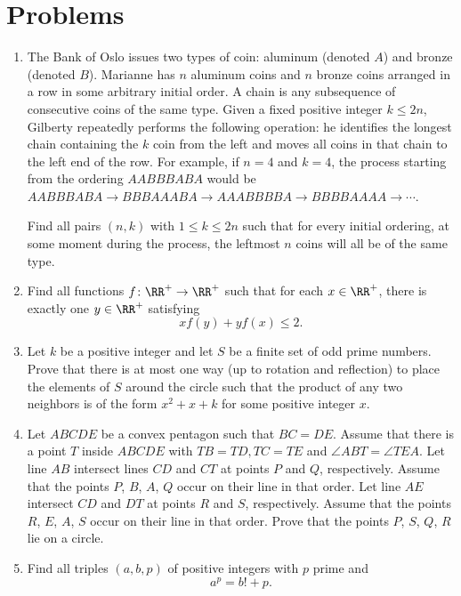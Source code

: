 \documentclass[11pt]{scrartcl}
\begin{document}
\section{Problems}
\begin{enumerate}[\bfseries 1.]
\item %
The Bank of Oslo issues two types of coin: aluminum (denoted $A$) and bronze
(denoted $B$). Marianne has $n$ aluminum coins and $n$ bronze coins arranged in a
row in some arbitrary initial order.
A chain is any subsequence of consecutive coins of the same type.
Given a fixed positive integer $k \leq 2n$,
Gilberty repeatedly performs the following operation:
he identifies the longest chain containing the $k$ coin from the left
and moves all coins in that chain to the left end of the row.
For example, if $n=4$ and $k=4$, the process starting
from the ordering $AABBBABA$ would be
$AABBBABA \to BBBAAABA \to AAABBBBA \to BBBBAAAA \to \dotsb$.

Find all pairs $(n,k)$ with $1 \leq k \leq 2n$
such that for every initial ordering,
at some moment during the process,
the leftmost $n$ coins will all be of the same type.

\item %
Find all functions $f \colon \RR^+ \to \RR^+$ such that for each $x \in \RR^+$,
there is exactly one $y \in \RR^+$ satisfying \[ xf(y)+yf(x) \leq 2. \]

\item %
Let $k$ be a positive integer and let $S$ be a finite set of odd prime numbers.
Prove that there is at most one way (up to rotation and reflection)
to place the elements of $S$ around the circle such that the product
of any two neighbors is of the form $x^2+x+k$ for some positive integer $x$.

\item %
Let $ABCDE$ be a convex pentagon such that $BC=DE$.
Assume that there is a point $T$ inside $ABCDE$ with $TB=TD,TC=TE$ and $\angle ABT = \angle TEA$.
Let line $AB$ intersect lines $CD$ and $CT$ at points $P$ and $Q$, respectively.
Assume that the points $P$, $B$, $A$, $Q$ occur on their line in that order.
Let line $AE$ intersect $CD$ and $DT$ at points $R$ and $S$, respectively.
Assume that the points $R$, $E$, $A$, $S$ occur on their line in that order.
Prove that the points $P$, $S$, $Q$, $R$ lie on a circle.

\item %
Find all triples $(a,b,p)$ of positive integers with $p$ prime and
\[ a^p=b!+p. \]


\end{enumerate}
\end{document}
